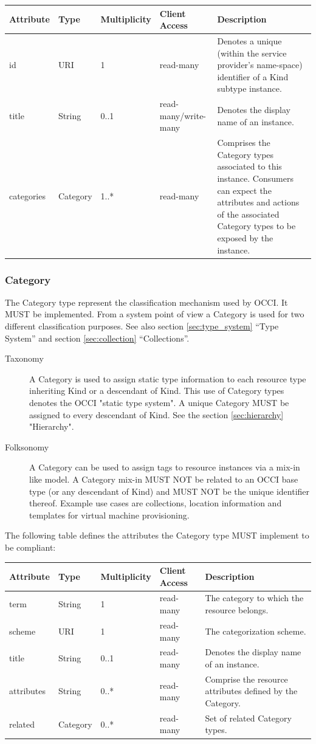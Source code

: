 \documentclass[10pt,a4paper]{article}
\begin{document}
\begin{tabular}{l|l|l|l|p{2.7in}}
Attribute & Type & Multiplicity & Client Access & Description \\
\hline
id & URI & 1 & read-many & Denotes a unique (within the service provider's name-space) identifier of a Kind subtype instance. \\
title & String & 0..1 & read-many/write-many & Denotes the display name of an instance. \\
categories & Category & 1..* & read-many & Comprises the Category types associated to this instance. Consumers can expect the attributes and actions of the associated Category types to be exposed by the instance. \\ 
\end{tabular}

\subsubsection{Category}
The Category type represent the classification mechanism used by OCCI. It MUST
be implemented. From a system point of view a Category is used for two
different classification purposes. See also section \ref{sec:type_system}
``Type System'' and section \ref{sec:collection} ``Collections''.

\begin{description}
\item[Taxonomy] A Category is used to assign static type information to each
resource type inheriting Kind or a descendant of Kind. This use of Category types
denotes the OCCI "static type system". A unique Category MUST be assigned to
every descendant of Kind. See the section \ref{sec:hierarchy} "Hierarchy".
\item[Folksonomy] A Category can be used to assign tags to resource instances
via a mix-in like model. A Category mix-in MUST NOT be related to an OCCI base
type (or any descendant of Kind) and MUST NOT be the unique identifier thereof.
Example use cases are collections, location information and templates for
virtual machine provisioning.
\end{description}

The following table defines the attributes the Category type MUST implement to
be compliant:

\begin{tabular}{l|l|l|l|p{2.7in}}
Attribute & Type & Multiplicity & Client Access & Description \\
\hline
term & String & 1 & read-many & The category to which the resource belongs. \\
scheme & URI & 1 & read-many & The categorization scheme. \\
title & String & 0..1 & read-many & Denotes the display name of an instance. \\
attributes & String & 0..* & read-many & Comprise the resource attributes defined by the Category. \\
related & Category & 0..* & read-many & Set of related Category types. \\
\end{tabular}
\end{document}
